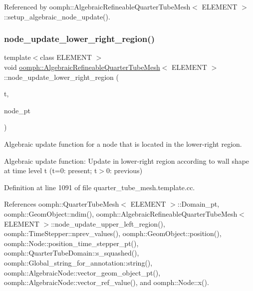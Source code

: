 Referenced by oomph\+::\+Algebraic\+Refineable\+Quarter\+Tube\+Mesh$<$ E\+L\+E\+M\+E\+N\+T $>$\+::setup\+\_\+algebraic\+\_\+node\+\_\+update().

\mbox{\label{classoomph_1_1AlgebraicRefineableQuarterTubeMesh_a52fb1161ebff25b5c638ac35cb541817}} 
\subsubsection{\texorpdfstring{node\+\_\+update\+\_\+lower\+\_\+right\+\_\+region()}{node\_update\_lower\_right\_region()}}
{\footnotesize\ttfamily template$<$class E\+L\+E\+M\+E\+NT $>$ \\
void \hyperlink{classoomph_1_1AlgebraicRefineableQuarterTubeMesh}{oomph\+::\+Algebraic\+Refineable\+Quarter\+Tube\+Mesh}$<$ E\+L\+E\+M\+E\+NT $>$\+::node\+\_\+update\+\_\+lower\+\_\+right\+\_\+region (\begin{DoxyParamCaption}\item[{const unsigned \&}]{t,  }\item[{\hyperlink{classoomph_1_1AlgebraicNode}{Algebraic\+Node} $\ast$\&}]{node\+\_\+pt }\end{DoxyParamCaption})\hspace{0.3cm}{\ttfamily [private]}}



Algebraic update function for a node that is located in the lower-\/right region. 

Algebraic update function\+: Update in lower-\/right region according to wall shape at time level t (t=0\+: present; t$>$0\+: previous) 

Definition at line 1091 of file quarter\+\_\+tube\+\_\+mesh.\+template.\+cc.



References oomph\+::\+Quarter\+Tube\+Mesh$<$ E\+L\+E\+M\+E\+N\+T $>$\+::\+Domain\+\_\+pt, oomph\+::\+Geom\+Object\+::ndim(), oomph\+::\+Algebraic\+Refineable\+Quarter\+Tube\+Mesh$<$ E\+L\+E\+M\+E\+N\+T $>$\+::node\+\_\+update\+\_\+upper\+\_\+left\+\_\+region(), oomph\+::\+Time\+Stepper\+::nprev\+\_\+values(), oomph\+::\+Geom\+Object\+::position(), oomph\+::\+Node\+::position\+\_\+time\+\_\+stepper\+\_\+pt(), oomph\+::\+Quarter\+Tube\+Domain\+::s\+\_\+squashed(), oomph\+::\+Global\+\_\+string\+\_\+for\+\_\+annotation\+::string(), oomph\+::\+Algebraic\+Node\+::vector\+\_\+geom\+\_\+object\+\_\+pt(), oomph\+::\+Algebraic\+Node\+::vector\+\_\+ref\+\_\+value(), and oomph\+::\+Node\+::x().



